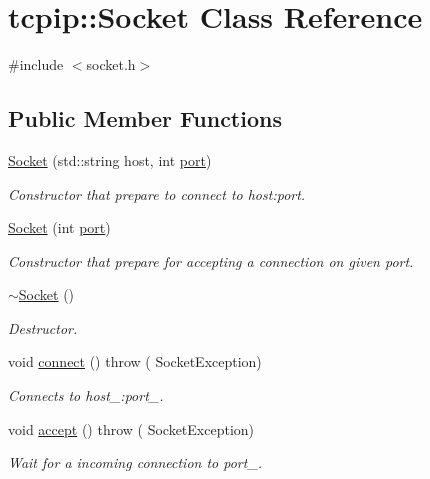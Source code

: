\hypertarget{classtcpip_1_1_socket}{}\section{tcpip\+:\+:Socket Class Reference}
\label{classtcpip_1_1_socket}


{\ttfamily \#include $<$socket.\+h$>$}

\subsection*{Public Member Functions}
\begin{DoxyCompactItemize}
\item 
\hyperlink{classtcpip_1_1_socket_adcf673cc4a6e4183f4a6f0929e13c5c1}{Socket} (std\+::string host, int \hyperlink{classtcpip_1_1_socket_ab7e67c84c32557ffb98d940081497d67}{port})
\begin{DoxyCompactList}\small\item\em Constructor that prepare to connect to host\+:port. \end{DoxyCompactList}\item 
\hyperlink{classtcpip_1_1_socket_af92b0e4bfc335b36971e94baa19fa017}{Socket} (int \hyperlink{classtcpip_1_1_socket_ab7e67c84c32557ffb98d940081497d67}{port})
\begin{DoxyCompactList}\small\item\em Constructor that prepare for accepting a connection on given port. \end{DoxyCompactList}\item 
\hyperlink{classtcpip_1_1_socket_a610c213f4b2fad07cc0bfddc3a5577e4}{$\sim$\+Socket} ()
\begin{DoxyCompactList}\small\item\em Destructor. \end{DoxyCompactList}\item 
void \hyperlink{classtcpip_1_1_socket_a8f89d187776729d15db3ba5c99c36acd}{connect} ()  throw ( Socket\+Exception)
\begin{DoxyCompactList}\small\item\em Connects to host\+\_\+\+:port\+\_\+. \end{DoxyCompactList}\item 
void \hyperlink{classtcpip_1_1_socket_a7847299f806a73798f4ceb95ab0e3d51}{accept} ()  throw ( Socket\+Exception)
\begin{DoxyCompactList}\small\item\em Wait for a incoming connection to port\+\_\+. \end{DoxyCompactList}\item 

\end{DoxyCompactItemize}

